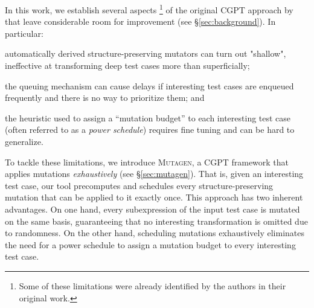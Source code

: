 \documentclass[sigconf,review,anonymous]{acmart}
\newcommand{\fuzzchick}{\textit{FuzzChick}\xspace}
\newcommand{\mutagen}{\textsc{Mutagen}\xspace}
\begin{document}
In this work, we establish several aspects%
%
\footnote{Some of these limitations were already identified by the authors in
their original work.}
%
of the original CGPT approach by \citeauthor{lampropoulos2019coverage} that
leave considerable room for improvement (see \S \ref{sec:background}).
%
In particular:
%
\begin{inparaenum}
\item automatically derived structure-preserving mutators can turn out
"shallow", ineffective at transforming deep test cases more than superficially;
\item the queuing mechanism can cause delays if interesting test cases are
  enqueued frequently and there is no way to prioritize them; and
\item the heuristic used to assign a ``mutation budget'' to each interesting
  test case (often referred to as a \emph{power schedule}) requires fine tuning
  and can be hard to generalize.
\end{inparaenum}
%


To tackle these limitations, we introduce \mutagen, a CGPT framework that
applies mutations \emph{exhaustively} (see \S \ref{sec:mutagen}).
%
%
%
%
%
%
That is, given an interesting test case, our tool precomputes and schedules
every structure-preserving mutation that can be applied to it exactly once.
%
This approach has two inherent advantages. %
%
On one hand,
%
every subexpression of the input test case is mutated on the same basis,
guaranteeing that no interesting transformation is omitted due to randomness.
%
%
On the other hand, scheduling mutations exhaustively eliminates the need for a
power schedule to assign a mutation budget to every interesting test case.
\end{document}
